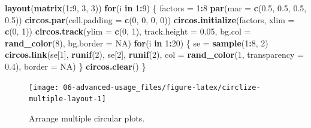 \documentclass[]{book}
\newenvironment{Shaded}{\begin{snugshade}}{\end{snugshade}}
\newcommand{\KeywordTok}[1]{\textcolor[rgb]{0.13,0.29,0.53}{\textbf{#1}}}
\newcommand{\DataTypeTok}[1]{\textcolor[rgb]{0.13,0.29,0.53}{#1}}
\newcommand{\DecValTok}[1]{\textcolor[rgb]{0.00,0.00,0.81}{#1}}
\newcommand{\FloatTok}[1]{\textcolor[rgb]{0.00,0.00,0.81}{#1}}
\newcommand{\StringTok}[1]{\textcolor[rgb]{0.31,0.60,0.02}{#1}}
\newcommand{\OtherTok}[1]{\textcolor[rgb]{0.56,0.35,0.01}{#1}}
\newcommand{\ControlFlowTok}[1]{\textcolor[rgb]{0.13,0.29,0.53}{\textbf{#1}}}
\newcommand{\OperatorTok}[1]{\textcolor[rgb]{0.81,0.36,0.00}{\textbf{#1}}}
\newcommand{\NormalTok}[1]{#1}
\begin{document}
\begin{Shaded}
\begin{Highlighting}[]
\KeywordTok{layout}\NormalTok{(}\KeywordTok{matrix}\NormalTok{(}\DecValTok{1}\OperatorTok{:}\DecValTok{9}\NormalTok{, }\DecValTok{3}\NormalTok{, }\DecValTok{3}\NormalTok{))}
\ControlFlowTok{for}\NormalTok{(i }\ControlFlowTok{in} \DecValTok{1}\OperatorTok{:}\DecValTok{9}\NormalTok{) \{}
\NormalTok{    factors =}\StringTok{ }\DecValTok{1}\OperatorTok{:}\DecValTok{8}
    \KeywordTok{par}\NormalTok{(}\DataTypeTok{mar =} \KeywordTok{c}\NormalTok{(}\FloatTok{0.5}\NormalTok{, }\FloatTok{0.5}\NormalTok{, }\FloatTok{0.5}\NormalTok{, }\FloatTok{0.5}\NormalTok{))}
    \KeywordTok{circos.par}\NormalTok{(}\DataTypeTok{cell.padding =} \KeywordTok{c}\NormalTok{(}\DecValTok{0}\NormalTok{, }\DecValTok{0}\NormalTok{, }\DecValTok{0}\NormalTok{, }\DecValTok{0}\NormalTok{))}
    \KeywordTok{circos.initialize}\NormalTok{(factors, }\DataTypeTok{xlim =} \KeywordTok{c}\NormalTok{(}\DecValTok{0}\NormalTok{, }\DecValTok{1}\NormalTok{))}
    \KeywordTok{circos.track}\NormalTok{(}\DataTypeTok{ylim =} \KeywordTok{c}\NormalTok{(}\DecValTok{0}\NormalTok{, }\DecValTok{1}\NormalTok{), }\DataTypeTok{track.height =} \FloatTok{0.05}\NormalTok{,}
        \DataTypeTok{bg.col =} \KeywordTok{rand_color}\NormalTok{(}\DecValTok{8}\NormalTok{), }\DataTypeTok{bg.border =} \OtherTok{NA}\NormalTok{)}
    \ControlFlowTok{for}\NormalTok{(i }\ControlFlowTok{in} \DecValTok{1}\OperatorTok{:}\DecValTok{20}\NormalTok{) \{}
\NormalTok{        se =}\StringTok{ }\KeywordTok{sample}\NormalTok{(}\DecValTok{1}\OperatorTok{:}\DecValTok{8}\NormalTok{, }\DecValTok{2}\NormalTok{)}
        \KeywordTok{circos.link}\NormalTok{(se[}\DecValTok{1}\NormalTok{], }\KeywordTok{runif}\NormalTok{(}\DecValTok{2}\NormalTok{), se[}\DecValTok{2}\NormalTok{], }\KeywordTok{runif}\NormalTok{(}\DecValTok{2}\NormalTok{), }
            \DataTypeTok{col =} \KeywordTok{rand_color}\NormalTok{(}\DecValTok{1}\NormalTok{, }\DataTypeTok{transparency =} \FloatTok{0.4}\NormalTok{), }\DataTypeTok{border =} \OtherTok{NA}\NormalTok{)}
\NormalTok{    \}}
    \KeywordTok{circos.clear}\NormalTok{()}
\NormalTok{\}}
\end{Highlighting}
\end{Shaded}

\begin{figure}

{\centering \texttt{[image: 06-advanced-usage\_files/figure-latex/circlize-multiple-layout-1]} 

}

\caption{Arrange multiple circular plots.}\label{fig:circlize-multiple-layout}
\end{figure}
\end{document}
